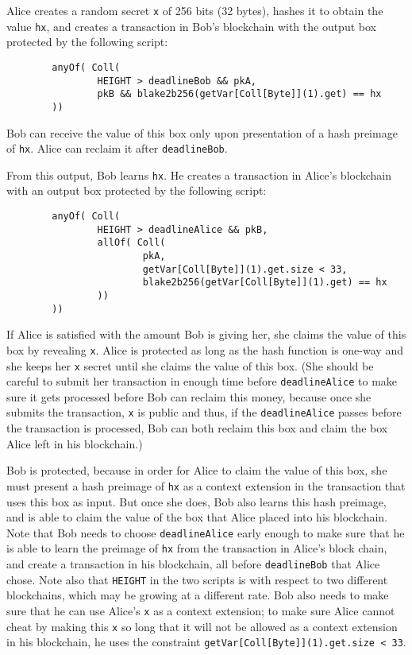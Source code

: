 \documentclass[11pt]{article}
\begin{document}
Alice creates a random secret \texttt{x} of 256 bits (32 bytes), hashes it to obtain the value \texttt{hx}, and creates a transaction in Bob's blockchain with the output box protected by the following script:
\begin{verbatim}
        anyOf( Coll(
                HEIGHT > deadlineBob && pkA,
                pkB && blake2b256(getVar[Coll[Byte]](1).get) == hx
        ))
\end{verbatim}
Bob can receive the value of this box only upon presentation of a hash preimage of \texttt{hx}. Alice can reclaim it after \texttt{deadlineBob}.

From this output, Bob learns \texttt{hx}. He creates a transaction in Alice's blockchain with an output box protected by the following script:
\begin{verbatim}
        anyOf( Coll(
                HEIGHT > deadlineAlice && pkB,
                allOf( Coll(
                        pkA,
                        getVar[Coll[Byte]](1).get.size < 33,
                        blake2b256(getVar[Coll[Byte]](1).get) == hx
                ))
        ))
\end{verbatim}

If Alice is satisfied with the amount Bob is giving her, she claims the value of this box by revealing \texttt{x}. Alice is protected as long as the hash function is one-way and she keeps her \texttt{x} secret until she claims the value of this box. (She should be careful to submit her transaction in enough time before \texttt{deadlineAlice} to make sure it gets processed before Bob can reclaim this money, because once she submits the transaction, \texttt{x} is public and thus, if the \texttt{deadlineAlice} passes before the transaction is processed, Bob can both reclaim this box and claim the box Alice left in his blockchain.)

Bob is protected, because in order for Alice to claim the value of this box, she must present a hash preimage of \texttt{hx} as a context extension in the transaction that uses this box as input. But once she does, Bob also learns this hash preimage, and is able to claim the value of the box that Alice placed into his blockchain. Note that Bob needs to choose \texttt{deadlineAlice} early enough to make sure that he is able to learn the preimage of \texttt{hx} from the transaction in Alice's block chain, and create a transaction in his blockchain, all before \texttt{deadlineBob} that Alice chose. Note also that \texttt{HEIGHT} in the two scripts is with respect to two different blockchains, which may be growing at a different rate. Bob also needs to make sure that he can use Alice's \texttt{x} as a context extension; to make sure Alice cannot cheat by making this \texttt{x} so long that it will not be allowed as a context extension in his blockchain, he uses the constraint \texttt{getVar[Coll[Byte]](1).get.size < 33}.
\end{document}
